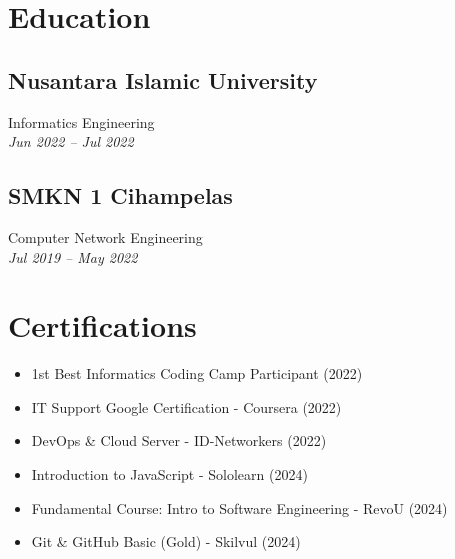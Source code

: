\section*{Education}

\subsection*{Nusantara Islamic University}
Informatics Engineering \\
\textit{Jun 2022 -- Jul 2022}

\subsection*{SMKN 1 Cihampelas}
Computer Network Engineering \\
\textit{Jul 2019 -- May 2022}

\section*{Certifications}
\begin{itemize}
    \item 1st Best Informatics Coding Camp Participant (2022)
    \item IT Support Google Certification - Coursera (2022)
    \item DevOps \& Cloud Server - ID-Networkers (2022)
    \item Introduction to JavaScript - Sololearn (2024)
    \item Fundamental Course: Intro to Software Engineering - RevoU (2024)
    \item Git \& GitHub Basic (Gold) - Skilvul (2024)
\end{itemize}
